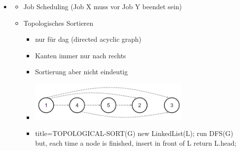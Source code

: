 \documentclass[
    12pt,
    a4paper,
    ngerman,
    color=3b,%
    marginpar=false,
    colorback=false,
    leqno,
]{tudaexercise}
\begin{document}
\begin{itemize}
        \item {}
            \begin{itemize}
                \item Job Scheduling (Job X muss vor Job Y beendet sein)
                \item Topologisches Sortieren
                    \begin{itemize}
                        \item nur für dag (directed acyclic graph)
                        \item Kanten immer nur nach rechts
                        \item Sortierung aber nicht eindeutig
                        \item[] \includegraphics[width=8cm]{pictures/topo.PNG}
                        \item[]
                            \begin{ccode}[autogobble]{title={TOPOLOGICAL-SORT(G)}}
                            new LinkedList(L);
                            run DFS(G) but, each time a node is finished, insert in front of L
                            return L.head;
                            \end{ccode} 
                    \end{itemize}
            \end{itemize}
        
\pagebreak


\end{itemize}
\end{document}
